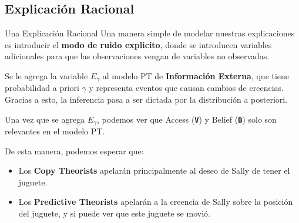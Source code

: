 \documentclass{beamer}
\begin{document}
\subsection{Explicación Racional}

\begin{frame}[fragile]{Una Explicación Racional}
Una manera simple de modelar nuestras explicaciones es introducir el \textbf{modo de ruido explicito}, donde se introducen variables adicionales para que las observaciones vengan de variables no observadas.

Se le agrega la variable \( E_\gamma \) al modelo PT de \textbf{Información Externa}, que tiene probabilidad a priori \( \gamma \) y representa eventos que causan cambios de creencias. Gracias a esto, la inferencia pasa a ser dictada por la distribución a posteriori.
\end{frame}

\begin{frame}
Una vez que se agrega \( E_\gamma \), podemos ver que Access (\texttt{\textbf{V}}) y Belief (\texttt{\textbf{B}}) solo son relevantes en el modelo PT\@.

De esta manera, podemos esperar que:
\begin{itemize}
	\item<2-3> Los \textbf{Copy Theorists} apelarán principalmente al deseo de Sally de tener el juguete.
	\item<3-3> Los \textbf{Predictive Theorists} apelarán a la creencia de Sally sobre la posición del juguete, y si puede ver que este juguete se movió.
\end{itemize}
\end{frame}
\end{document}
